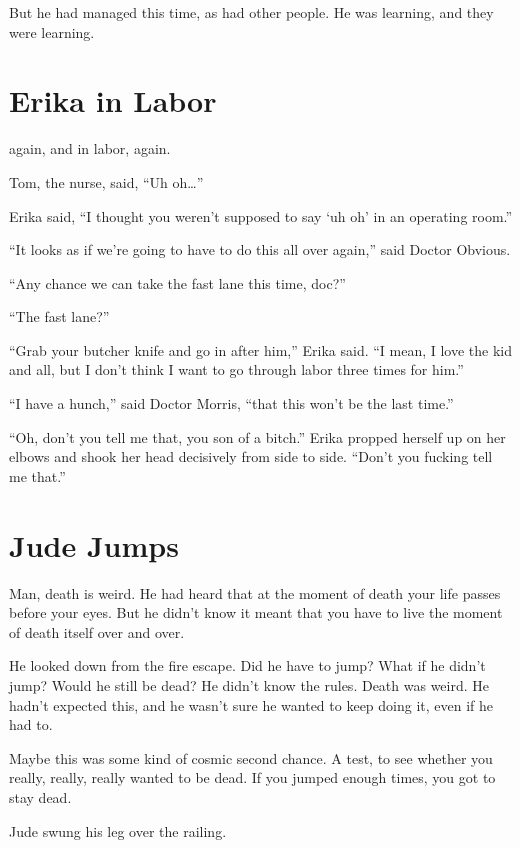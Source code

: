 But he had managed this time, as had other people. He was learning, and they were learning.



\chapter{Erika in Labor}

 again, and in labor, again.

Tom, the nurse, said, “Uh oh…”

Erika said, “I thought you weren’t supposed to say ‘uh oh’ in an operating room.”

“It looks as if we’re going to have to do this all over again,” said Doctor Obvious.

“Any chance we can take the fast lane this time, doc?”

“The fast lane?”

“Grab your butcher knife and go in after him,” Erika said. “I mean, I love the kid and all, but I don’t think I want to go through labor three times for him.”

“I have a hunch,” said Doctor Morris, “that this won’t be the last time.”

“Oh, don’t you tell me that, you son of a bitch.” Erika propped herself up on her elbows and shook her head decisively from side to side. “Don’t you fucking tell me that.”



\chapter{Jude Jumps}

 Man, death is weird. He had heard that at the moment of death your life passes before your eyes. But he didn’t know it meant that you have to live the moment of death itself over and over.

He looked down from the fire escape. Did he have to jump? What if he didn’t jump? Would he still be dead? He didn’t know the rules. Death was weird. He hadn’t expected this, and he wasn’t sure he wanted to keep doing it, even if he had to.

Maybe this was some kind of cosmic second chance. A test, to see whether you really, really, really wanted to be dead. If you jumped enough times, you got to stay dead.

Jude swung his leg over the railing.

